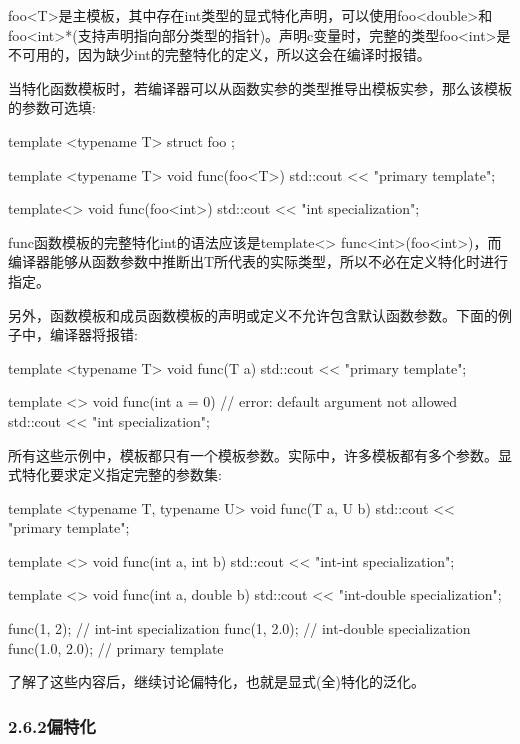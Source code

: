 foo<T>是主模板，其中存在int类型的显式特化声明，可以使用foo<double>和foo<int>*(支持声明指向部分类型的指针)。声明c变量时，完整的类型foo<int>是不可用的，因为缺少int的完整特化的定义，所以这会在编译时报错。

当特化函数模板时，若编译器可以从函数实参的类型推导出模板实参，那么该模板的参数可选填:

\begin{cpp}
template <typename T>
struct foo {};

template <typename T>
void func(foo<T>)
{
	std::cout << "primary template\n";
}

template<>
void func(foo<int>)
{
	std::cout << "int specialization\n";
}
\end{cpp}

func函数模板的完整特化int的语法应该是template<> func<int>(foo<int>)，而编译器能够从函数参数中推断出T所代表的实际类型，所以不必在定义特化时进行指定。

另外，函数模板和成员函数模板的声明或定义不允许包含默认函数参数。下面的例子中，编译器将报错:

\begin{cpp}
template <typename T>
void func(T a)
{
	std::cout << "primary template\n";
}

template <>
void func(int a = 0) // error: default argument not allowed
{
	std::cout << "int specialization\n";
}
\end{cpp}

所有这些示例中，模板都只有一个模板参数。实际中，许多模板都有多个参数。显式特化要求定义指定完整的参数集:

\begin{cpp}
template <typename T, typename U>
void func(T a, U b)
{
	std::cout << "primary template\n";
}

template <>
void func(int a, int b)
{
std::cout << "int-int specialization\n";
}

template <>
void func(int a, double b)
{
std::cout << "int-double specialization\n";
}

func(1, 2); // int-int specialization
func(1, 2.0); // int-double specialization
func(1.0, 2.0); // primary template
\end{cpp}

了解了这些内容后，继续讨论偏特化，也就是显式(全)特化的泛化。

\subsubsection{2.6.2\hspace{0.2cm}偏特化}

